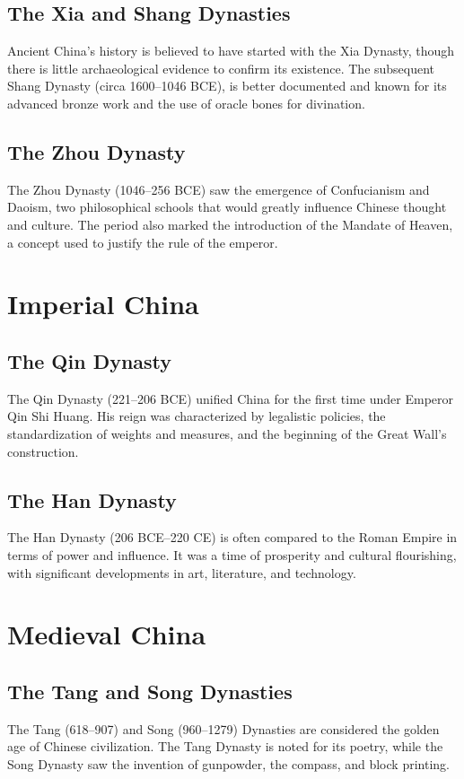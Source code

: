\documentclass[a4paper,12pt]{book}
\begin{document}
\subsection{The Xia and Shang Dynasties}
Ancient China’s history is believed to have started with the Xia Dynasty, though there is little archaeological evidence to confirm its existence. The subsequent Shang Dynasty (circa 1600–1046 BCE), is better documented and known for its advanced bronze work and the use of oracle bones for divination.

\subsection{The Zhou Dynasty}
The Zhou Dynasty (1046–256 BCE) saw the emergence of Confucianism and Daoism, two philosophical schools that would greatly influence Chinese thought and culture. The period also marked the introduction of the Mandate of Heaven, a concept used to justify the rule of the emperor.

\section{Imperial China}
\subsection{The Qin Dynasty}
The Qin Dynasty (221–206 BCE) unified China for the first time under Emperor Qin Shi Huang. His reign was characterized by legalistic policies, the standardization of weights and measures, and the beginning of the Great Wall’s construction.

\subsection{The Han Dynasty}
The Han Dynasty (206 BCE–220 CE) is often compared to the Roman Empire in terms of power and influence. It was a time of prosperity and cultural flourishing, with significant developments in art, literature, and technology.

\section{Medieval China}
\subsection{The Tang and Song Dynasties}
The Tang (618–907) and Song (960–1279) Dynasties are considered the golden age of Chinese civilization. The Tang Dynasty is noted for its poetry, while the Song Dynasty saw the invention of gunpowder, the compass, and block printing.
\end{document}
